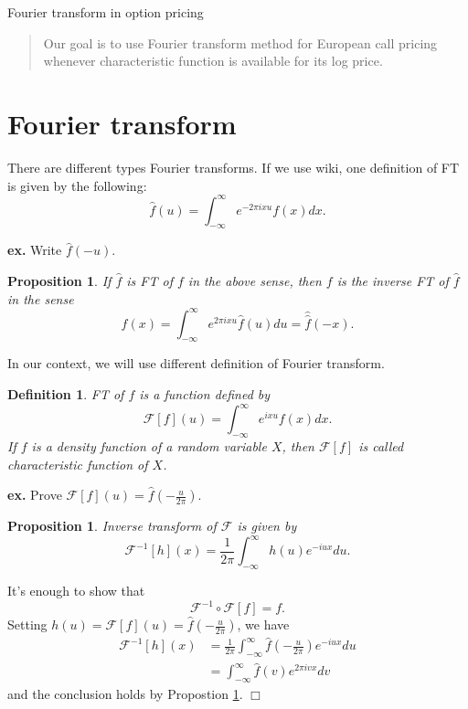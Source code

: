 \documentclass{article}
\newtheorem{definition}[theorem]{Definition}
\newtheorem{proposition}[theorem]{Proposition}
\newenvironment{proof}{\noindent {\sc Proof:}}{$\Box$} %
\begin{document}
\begin{center}
Fourier transform in option pricing
\end{center}

\begin{abstract}
Our goal is
to use Fourier transform method for European call pricing whenever characteristic function is available for its log price.
\end{abstract}

\section{Fourier transform}
There are  different types Fourier transforms. 
If we use wiki, one definition of FT is given by the following:
\begin{equation}
\label{eq:ft01}
\hat f(u) = \int_{-\infty}^\infty e^{-2\pi ix u} f(x) dx.
\end{equation}

{\bf ex.} Write $\hat f(-u)$.

\begin{proposition} \label{p:ift01}
If $\hat f$ is FT of $f$ in the above sense, then $f$ is the inverse FT of $\hat f$ in the sense
$$f(x) = \int_{-\infty}^\infty e^{2\pi ix u} \hat f(u) du = \hat {\hat f} (-x).$$
\end{proposition}

In our context, we will use different definition of Fourier transform.
\begin{definition}
\label{d:ft01}
FT of $f$ is a function defined by
$$\mathcal F[f] (u) = \int_{-\infty}^\infty e^{ ix u} f(x) dx.$$
If $f$ is a density function of a random variable $X$, then $\mathcal F[f]$ is called characteristic function of $X$.
\end{definition}

{\bf ex.}
Prove $\mathcal F[f] (u) = \hat f(- \frac{u}{2 \pi})$.

\begin{proposition}
Inverse transform of $\mathcal F$ is given by
$$\mathcal F^{-1}[h](x) = \frac{1}{2\pi}\int_{-\infty}^\infty h(u) e^{-iux} du.$$
\end{proposition}
\begin{proof}
It's enough to show that
$$\mathcal F^{-1} \circ \mathcal F[f] = f.$$
Setting $h (u) = \mathcal F[f] (u) =  \hat f(- \frac{u}{2 \pi})$, we have
$$
\begin{array}
{ll}
\mathcal F^{-1}[h](x) &= \frac{1}{2\pi}\int_{-\infty}^\infty \hat f(- \frac{u}{2 \pi}) e^{-iux} du
\\ & = \int_{-\infty}^\infty \hat f(v) e^{2\pi i v x} dv
\end{array}
$$
and the conclusion holds by Propostion \ref{p:ift01}.
\end{proof}
\end{document}
